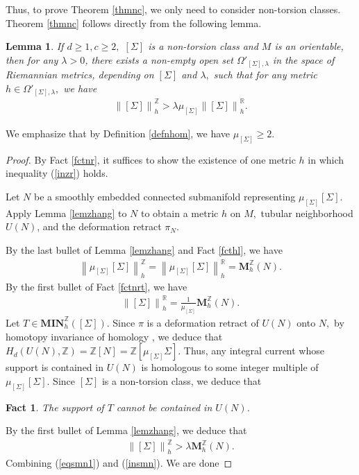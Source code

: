 \documentclass[11pt,a4paper]{amsart}
\numberwithin{equation}{section}
\newcommand{\mn}{\mathbf{MIN}}
\newcommand{\lam}{\lambda}
\newcommand{\Om}{\Omega}
\newcommand{\Si}{\Sigma}
\newcommand{\ms}{\mathbf{M}}
\newcommand{\nog}[1]{\no{#1}^{\R}}
\newcommand{\no}[1]{\left\lVert#1\right\rVert}
\newcommand{\R}{\mathbb{R}}
\newcommand{\Z}{\mathbb{Z}}
\theoremstyle{plain}
\newtheorem{lem}{Lemma}[subsection]
\newtheorem{fact}{Fact}[subsection]
\theoremstyle{definition}
\numberwithin{equation}{subsection}
\begin{document}
	Thus, to prove Theorem \ref{thmnc}, we only need to consider non-torsion classes. Theorem \ref{thmnc} follows directly from the following lemma.
	\begin{lem}\label{lemcal}
		If $d\ge 1,c\ge 2,$ $[\Si]$ is a non-torsion class and $M$ is an orientable, then for any $\lam>0$, there exists a non-empty open set $\Om'_{[\Si],\lam}$ in the space of Riemannian metrics, depending on $[\Si]$ and $\lam,$ such that for any metric $h\in \Om'_{[\Si],\lam},$ we have
		\begin{align}
			\no{[\Si]}_h^{\Z}>\lam\mu_{[\Si]}\nog{[\Si]}_h.\label{inzr}
		\end{align} 
	\end{lem}
	We emphasize that by Definition \ref{defnhom}, we have $\mu_{[\Si]}\ge 2.$
	\begin{proof}
		By Fact \ref{fctnr}, it suffices to show the existence of one metric $h$ in which inequality (\ref{inzr}) holds.
		
		Let $N$ be a smoothly embedded connected submanifold representing $\mu_{[\Si]}[\Si].$ Apply Lemma \ref{lemzhang} to $N$ to obtain a metric $h$ on $M,$ tubular neighborhood $U(N)$, and the deformation retract $\pi_N.$
		
		By the last bullet of Lemma \ref{lemzhang} and Fact \ref{fcthl}, we have
		\begin{align}\label{eqzrn}
			\no{\mu_{[\Si]}[\Si]}_h^{\Z}=\no{\mu_{[\Si]}[\Si]}_h^{\R}=\ms_h^{\Z}(N).
		\end{align}
		By the first bullet of Fact \ref{fctnrt}, we have
		\begin{align}\label{eqsmn1}
			\no{[\Si]}_h^{\R}=\frac{1}{\mu_{[\Si]}}\ms_h^{\Z}(N).
		\end{align}
		Let $T\in\mn_h^{\Z}\left([\Si]\right).$ Since $\pi$ is a deformation retract of $U(N)$ onto $N,$ by homotopy invariance of homology \cite{AH}, we deduce that $H_d(U(N),\Z)=\Z[N]=\Z[\mu_{[\Si]}\Si].$ Thus, any integral current whose support is contained in $U(N)$ is homologous to some integer multiple of $\mu_{[\Si]}[\Si].$ Since $[\Si]$ is a non-torsion class, we deduce that
		\begin{fact}
			The support of $T$ cannot be contained in $U(N)$.
		\end{fact} 
		By the first bullet of Lemma \ref{lemzhang}, we deduce that
		\begin{align}\label{insmn}
			\no{[\Si]}_h^{\Z}>\lam\ms_h^{\Z}(N).
		\end{align}
		Combining (\ref{eqsmn1}) and (\ref{insmn}). We are done
	\end{proof}
\end{document}
